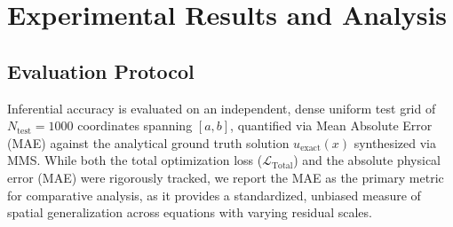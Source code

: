 
\section{Experimental Results and Analysis}
\label{sec:results}

\begin{table}[t]
\centering
{}
\caption{Benchmark Suite of Volterra Integro-Differential Equations (Note that all our problems are defined on $\Omega = [0,1]$).}
\label{tab:equations_suite}
\end{table}

\subsection{Evaluation Protocol}
Inferential accuracy is evaluated on an independent, dense uniform test grid of $N_{\text{test}} = 1000$ coordinates spanning $[a, b]$, quantified via Mean Absolute Error (MAE) against the analytical ground truth solution $u_{\text{exact}}(x)$ synthesized via MMS. While both the total optimization loss ($\mathcal{L}_{\text{Total}}$) and the absolute physical error (MAE) were rigorously tracked, we report the MAE as the primary metric for comparative analysis, as it provides a standardized, unbiased measure of spatial generalization across equations with varying residual scales.

